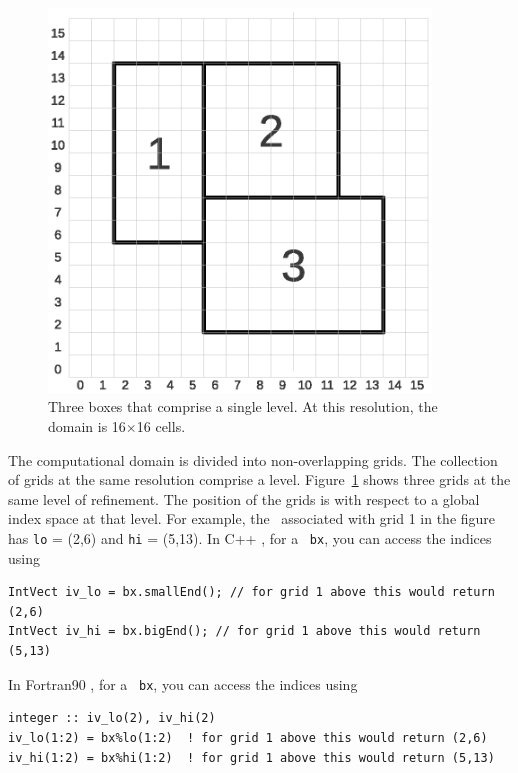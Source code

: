 \begin{figure}[tb]
\centering
\includegraphics[width=4.0in]{./Introduction/index_grid2}
\caption{\label{fig:boxes} Three boxes that comprise a single level.
At this resolution, the domain is 16$\times$16 cells.}
\end{figure}
The computational domain is divided into non-overlapping grids.  The collection of
grids at the same resolution comprise a level.
Figure~\ref{fig:boxes} shows three grids at the same level of
refinement.  The position of the grids is with respect to a global
index space at that level.  For example, the \BoxType\ associated with grid 1 
in the figure has {\tt lo} = (2,6) and {\tt hi} = (5,13).  In C++ \BoxLib, for a 
\BoxType\ {\tt bx}, you can access the indices using
\begin{lstlisting}[language={[gnu]make},mathescape=false]
IntVect iv_lo = bx.smallEnd(); // for grid 1 above this would return (2,6)
IntVect iv_hi = bx.bigEnd(); // for grid 1 above this would return (5,13)
\end{lstlisting}
In Fortran90 \BoxLib, for a 
\BoxType\ {\tt bx}, you can access the indices using
\begin{lstlisting}[language={[gnu]make},mathescape=false]
integer :: iv_lo(2), iv_hi(2)
iv_lo(1:2) = bx%lo(1:2)  ! for grid 1 above this would return (2,6)
iv_hi(1:2) = bx%hi(1:2)  ! for grid 1 above this would return (5,13)
\end{lstlisting}

\subsection{\BoxArray}


